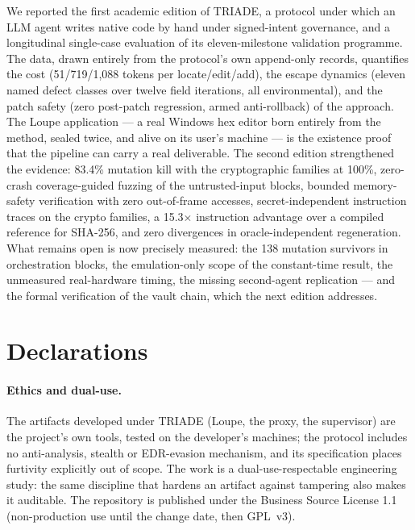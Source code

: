 \documentclass[11pt,a4paper]{article}
\begin{document}
We reported the first academic edition of TRIADE, a protocol under which
an LLM agent writes native code by hand under signed-intent governance,
and a longitudinal single-case evaluation of its eleven-milestone
validation programme. The data, drawn entirely from the protocol's own
append-only records, quantifies the cost (51/719/1{,}088 tokens per
locate/edit/add), the escape dynamics (eleven named defect classes over
twelve field iterations, all environmental), and the patch safety (zero
post-patch regression, armed anti-rollback) of the approach. The Loupe
application --- a real Windows hex editor born entirely from the method,
sealed twice, and alive on its user's machine --- is the existence proof
that the pipeline can carry a real deliverable. The second edition strengthened the
evidence: 83.4\% mutation kill with the cryptographic families at
100\%, zero-crash coverage-guided fuzzing of the untrusted-input blocks,
bounded memory-safety verification with zero out-of-frame accesses,
secret-independent instruction traces on the crypto families, a 15.3$\times$
instruction advantage over a compiled reference for SHA-256, and zero
divergences in oracle-independent regeneration. What remains open is now
precisely measured: the 138 mutation survivors in orchestration blocks,
the emulation-only scope of the constant-time result, the unmeasured
real-hardware timing, the missing second-agent replication --- and the
formal verification of the vault chain, which the next edition
addresses.

\section*{Declarations}

\paragraph{Ethics and dual-use.} The artifacts developed under TRIADE
(Loupe, the proxy, the supervisor) are the project's own tools, tested on
the developer's machines; the protocol includes no anti-analysis,
stealth or EDR-evasion mechanism, and its specification places furtivity
explicitly out of scope. The work is a dual-use-respectable engineering
study: the same discipline that hardens an artifact against tampering
also makes it auditable. The repository is published under the Business
Source License 1.1 (non-production use until the change date, then
GPL~v3).
\end{document}
